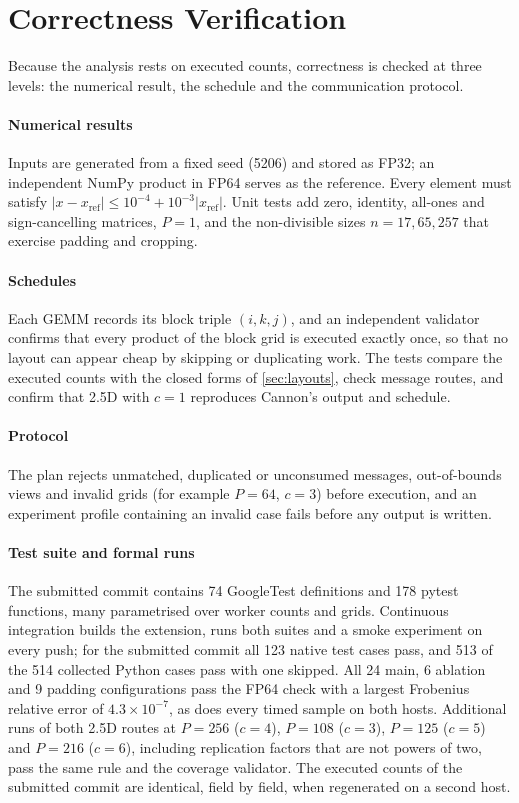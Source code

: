 \documentclass[11pt,a4paper]{article}
\begin{document}
\section{Correctness Verification}
\label{sec:verify}

Because the analysis rests on executed counts, correctness is checked at three levels: the numerical
result, the schedule and the communication protocol.

\paragraph{Numerical results}
Inputs are generated from a fixed seed (5206) and stored as FP32; an independent NumPy product in FP64
serves as the reference. Every element must satisfy $|x-x_{\mathrm{ref}}|\le10^{-4}+10^{-3}|x_{\mathrm{ref}}|$.
Unit tests add zero, identity, all-ones and sign-cancelling matrices, $P=1$, and the non-divisible sizes
$n=17,65,257$ that exercise padding and cropping.

\paragraph{Schedules}
Each GEMM records its block triple $(i,k,j)$, and an independent validator confirms that every product of
the block grid is executed exactly once, so that no layout can appear cheap by skipping or duplicating
work. The tests compare the executed counts with the closed forms of \cref{sec:layouts}, check message
routes, and confirm that 2.5D with $c=1$ reproduces Cannon's output and schedule.

\paragraph{Protocol}
The plan rejects unmatched, duplicated or unconsumed messages, out-of-bounds views and invalid grids (for
example $P=64$, $c=3$) before execution, and an experiment profile containing an invalid case fails before
any output is written.

\paragraph{Test suite and formal runs}
The submitted commit contains 74 GoogleTest definitions and 178 pytest functions, many parametrised over
worker counts and grids. Continuous integration builds the extension, runs both suites and a smoke
experiment on every push; for the submitted commit all 123 native test cases pass, and 513 of the 514
collected Python cases pass with one skipped. All 24 main, 6 ablation and
9 padding configurations pass the FP64 check with a largest Frobenius relative error of
$4.3\times10^{-7}$, as does every timed sample on both hosts. Additional runs of both 2.5D routes at
$P=256$ ($c=4$), $P=108$ ($c=3$), $P=125$ ($c=5$) and $P=216$ ($c=6$), including replication factors
that are not powers of two, pass the same rule and the coverage validator. The executed counts of the
submitted commit are identical, field by field, when regenerated on a second host.
\end{document}

